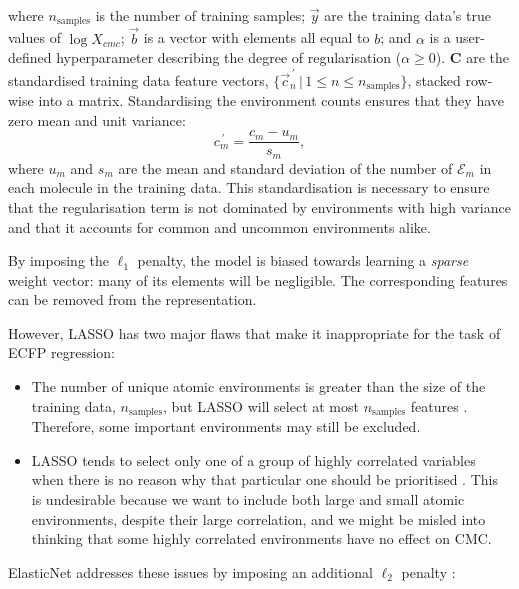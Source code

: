 where $n_{\text{samples}}$ is the number of training samples; $\vec{y}$ are the training data's true values of $\log X_{cmc}$; $\vec{b}$ is a vector with elements all equal to $b$; and $\alpha$ is a user-defined hyperparameter
describing the degree of regularisation ($\alpha \geq 0$). $\mathbf{C}$ are the standardised training data feature vectors, $\{\vec{c}^{\,\prime}_n \,|\, 1 \leq n \leq n_\text{samples}\}$, stacked row-wise into a matrix. Standardising the environment counts ensures that they have zero mean and unit variance:
\begin{equation}
    \label{eq:standard-scaling}
    {c}^{\,\prime}_m = \frac{c_m - u_m}{s_m},
\end{equation}
where $u_m$ and $s_m$ are the mean and standard deviation of the number of $\mathcal{E}_m$ in each molecule in the training data. This standardisation is necessary to ensure that the regularisation term is not dominated by
environments with high variance and that it accounts for common and uncommon environments alike.

By imposing the $\ell_1$ penalty, the model is biased towards learning a \emph{sparse} weight vector: many of its elements will be negligible. The corresponding features can be removed from the representation.

However, LASSO has two major flaws that make it inappropriate for the task of ECFP regression:

\begin{itemize}
    \item The number of unique atomic environments is greater than the size of the training data, $n_\text{samples}$, but LASSO will select at most $n_\text{samples}$ features \cite{efronLeastAngleRegression2004}.
          Therefore, some important environments may still be excluded.
          \item LASSO tends to select only one of a group of highly correlated
          variables when there is no reason why that particular one should be
          prioritised \cite{zouRegularizationVariableSelection2005}. This is
          undesirable because we want to include both large and small atomic
          environments, despite their large correlation, and we might be misled into
          thinking that some highly correlated environments have no effect on CMC.
\end{itemize}

ElasticNet addresses these issues by imposing an additional $\ell_2$ penalty
\cite{zouRegularizationVariableSelection2005}:

